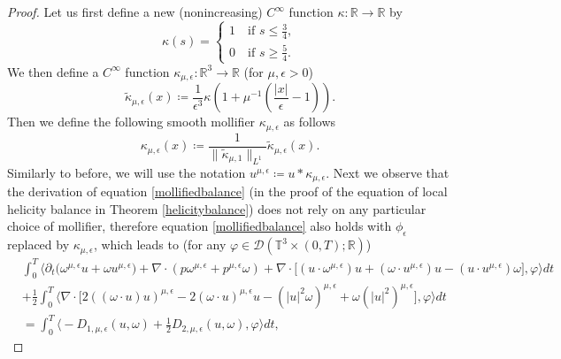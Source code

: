 \documentclass[10pt,a4paper]{amsart}
\begin{document}
\begin{proof}
Let us first define a new (nonincreasing) $C^\infty$ function $\kappa: \mathbb{R} \rightarrow \mathbb{R}$ by
\begin{equation*}
\kappa (s) = \begin{cases}
1 \quad \text{if } s \leq \frac{3}{4}, \\
0 \quad \text{if } s \geq \frac{5}{4}.
\end{cases}
\end{equation*}
We then define a $C^\infty$ function $\kappa_{\mu,\epsilon}: \mathbb{R}^3 \rightarrow \mathbb{R}$ (for $\mu, \epsilon > 0$)
\begin{equation*}
\widetilde{\kappa}_{\mu,\epsilon} (x) \coloneqq \frac{1}{\epsilon^3 } \kappa \left( 1 + \mu^{-1} \left(\frac{\lvert x \rvert}{\epsilon} -1 \right) \right).
\end{equation*}
Then we define the following smooth mollifier $\kappa_{\mu,\epsilon}$ as follows
\begin{equation*}
\kappa_{\mu,\epsilon} (x) \coloneqq \frac{1}{\lVert \widetilde{\kappa}_{\mu,1} \rVert_{L^1}} \widetilde{\kappa}_{\mu,\epsilon} (x).
\end{equation*}
Similarly to before, we will use the notation $u^{\mu,\epsilon} \coloneqq u * \kappa_{\mu,\epsilon}$. Next we observe that the derivation of equation \eqref{mollifiedbalance} (in the proof of the equation of local helicity balance in Theorem \ref{helicitybalance}) does not rely on any particular choice of mollifier, therefore equation \eqref{mollifiedbalance} also holds with $\phi_\epsilon$ replaced by $\kappa_{\mu,\epsilon}$, which leads to (for any $\varphi \in \mathcal{D} (\mathbb{T}^3 \times (0,T);\mathbb{R})$)
\begin{align}
&\int_0^T \bigg\langle \partial_t \big( \omega^{\mu,\epsilon} u + \omega u^{\mu,\epsilon} \big) + \nabla \cdot (p \omega^{\mu,\epsilon} + p^{\mu,\epsilon} \omega) + \nabla \cdot \big[ (u \cdot \omega^{\mu,\epsilon}) u + (\omega \cdot u^{\mu,\epsilon}) u - (u \cdot u^{\mu,\epsilon}) \omega \big], \varphi \bigg\rangle dt \nonumber \\
&+ \frac{1}{2} \int_0^T \bigg\langle \nabla \cdot \big[ 2((\omega \cdot u) u)^{\mu,\epsilon} - 2(\omega \cdot u)^{\mu,\epsilon} u - ( \lvert u \rvert^2 \omega)^{\mu,\epsilon} + \omega (\lvert u \rvert^2)^{\mu,\epsilon} \big], \varphi \bigg\rangle dt \nonumber \\
&= \int_0^T \bigg\langle - D_{1,\mu,\epsilon} (u, \omega) + \frac{1}{2} D_{2,\mu,\epsilon} (u, \omega) ,  \varphi \bigg\rangle dt, \label{mollifiedsphericalbalance}

\end{align}
\end{proof}
\end{document}
